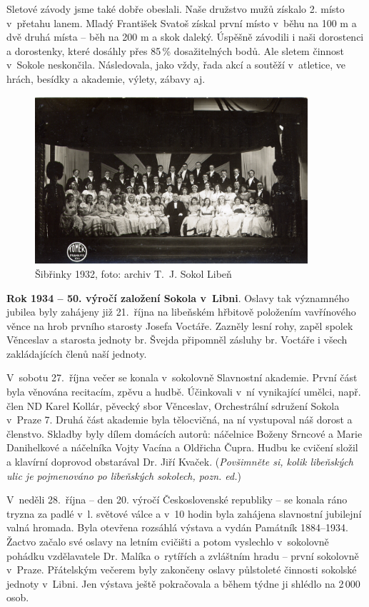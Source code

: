 \documentclass[a5paper, 11pt, twoside]{article}
\begin{document}
Sletové závody jsme také dobře obeslali. Naše družstvo mužů získalo 2.
místo v~přetahu lanem. Mladý František Svatoš získal první místo v~běhu
na 100 m a dvě druhá místa -- běh na 200 m a skok daleký. Úspěšně
závodili i naši dorostenci a dorostenky, které dosáhly přes 85\,\%
dosažitelných bodů. Ale sletem činnost v~Sokole neskončila. Následovala,
jako vždy, řada akcí a soutěží v~atletice, ve hrách, besídky a akademie,
výlety, zábavy aj.

\begin{figure}[h!]
  \centering 
  \includegraphics[width=0.9\textwidth]{img/30_sibrinky.jpg}
  \caption*{Šibřinky 1932, foto: archiv T.~J. Sokol Libeň}
\end{figure}

\textbf{Rok 1934 -- 50. výročí založení Sokola v~Libni}. Oslavy tak významného jubilea byly zahájeny již 21.~října na libeňském
hřbitově položením vavřínového věnce na hrob prvního starosty Josefa
Voctáře. Zazněly lesní rohy, zapěl spolek Věnceslav a starosta jednoty
br. Švejda připomněl zásluhy br. Voctáře i všech zakládajících členů
naší jednoty.

V~sobotu 27.~října večer se konala v~sokolovně Slavnostní akademie.
První část byla věnována recitacím, zpěvu a hudbě. Účinkovali v~ní
vynikající umělci, např. člen ND Karel Kollár, pěvecký sbor Věnceslav,
Orchestrální sdružení Sokola v~Praze 7. Druhá část akademie byla
tělocvičná, na ní vystupoval náš dorost a členstvo. Skladby byly dílem
domácích autorů: náčelnice Boženy Srncové a Marie Danihelkové a
náčelníka Vojty Vacína a Oldřicha Čupra. Hudbu ke cvičení složil a
klavírní doprovod obstarával Dr. Jiří Kvaček. (\textit{Povšimněte si,
kolik libeňských ulic je pojmenováno po libeňských sokolech, pozn. ed.})

V~neděli 28.~října -- den 20. výročí Československé republiky -- se
konala ráno tryzna za padlé v~l. světové válce a v~10 hodin byla
zahájena slavnostní jubilejní valná hromada. Byla otevřena rozsáhlá
výstava a vydán Památník 1884--1934. Žactvo začalo své oslavy
na letním cvičišti a potom vyslechlo v~sokolovně pohádku vzdělavatele
Dr. Malíka o~rytířích a zvláštním hradu -- první sokolovně v~Praze.
Přátelským večerem byly zakončeny oslavy půlstoleté činnosti sokolské
jednoty v~Libni. Jen výstava ještě pokračovala a během týdne ji shlédlo
na 2\,000 osob.
\end{document}
